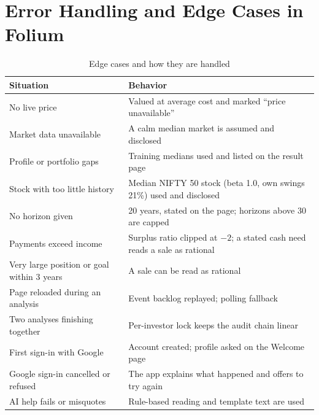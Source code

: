 \section{Error Handling and Edge Cases in Folium}
\begin{table}[H]
\centering
\small
\begin{tabularx}{\textwidth}{|P{4.6cm}|L|}
\hline
\textbf{Situation} & \textbf{Behavior} \\
\hline
No live price & Valued at average cost and marked ``price unavailable'' \\
\hline
Market data unavailable & A calm median market is assumed and disclosed \\
\hline
Profile or portfolio gaps & Training medians used and listed on the result page \\
\hline
Stock with too little history & Median NIFTY 50 stock (beta 1.0, own swings 21\%) used and disclosed \\
\hline
No horizon given & 20 years, stated on the page; horizons above 30 are capped \\
\hline
Payments exceed income & Surplus ratio clipped at $-2$; a stated cash need reads a sale as rational \\
\hline
Very large position or goal within 3 years & A sale can be read as rational \\
\hline
Page reloaded during an analysis & Event backlog replayed; polling fallback \\
\hline
Two analyses finishing together & Per-investor lock keeps the audit chain linear \\
\hline
First sign-in with Google & Account created; profile asked on the Welcome page \\
\hline
Google sign-in cancelled or refused & The app explains what happened and offers to try again \\
\hline
AI help fails or misquotes & Rule-based reading and template text are used \\
\hline
\end{tabularx}
\caption{Edge cases and how they are handled}
\label{tab:edge}
\end{table}
